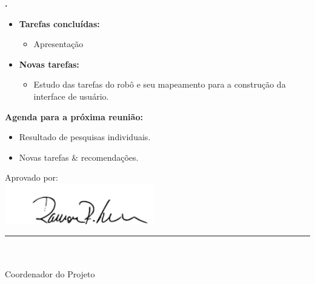 		
   \textbf{.} 
	\begin{itemize}
		\item \textbf{Tarefas concluídas:}
			\begin{itemize}    
				\item Apresentação
			\end{itemize}
		
		\item \textbf{Novas tarefas:}
			\begin{itemize} 
			    \item Estudo das tarefas do robô e seu mapeamento para a construção da
			    interface de usuário.
			\end{itemize}
	\end{itemize}

			



\textbf{Agenda para a próxima reunião:}
  \begin{itemize}
    \item Resultado de pesquisas individuais.
    \item Novas tarefas \& recomendações.
  \end{itemize}


\vspace{5mm}%
\parbox[t]{70mm}{
  Aprovado por: \\[5mm]
  \centering
  \includegraphics[width=65mm]{figs/logo/assinatura-ramon.png} \\[-4mm]
  \rule[2mm]{70mm}{0.1mm} \\
  \ramon \\[1mm]
  Coordenador do Projeto \\
}

\fim
